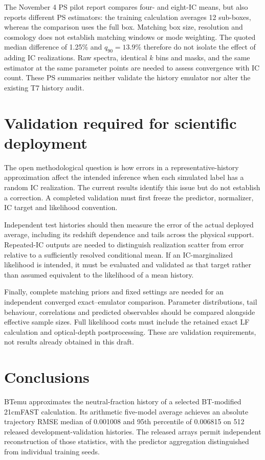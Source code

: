 The November 4 PS pilot report compares four- and eight-IC means, but also reports different PS estimators: the training calculation averages 12 sub-boxes, whereas the comparison uses the full box. Matching box size, resolution and cosmology does not establish matching windows or mode weighting. The quoted median difference of 1.25\% and $q_{90}=13.9\%$ therefore do not isolate the effect of adding IC realizations. Raw spectra, identical $k$ bins and masks, and the same estimator at the same parameter points are needed to assess convergence with IC count. These PS summaries neither validate the history emulator nor alter the existing T7 history audit.

\section{Validation required for scientific deployment}\label{validation-plan}

The open methodological question is how errors in a representative-history approximation affect the intended inference when each simulated label has a random IC realization. The current results identify this issue but do not establish a correction. A completed validation must first freeze the predictor, normalizer, IC target and likelihood convention.

Independent test histories should then measure the error of the actual deployed average, including its redshift dependence and tails across the physical support. Repeated-IC outputs are needed to distinguish realization scatter from error relative to a sufficiently resolved conditional mean. If an IC-marginalized likelihood is intended, it must be evaluated and validated as that target rather than assumed equivalent to the likelihood of a mean history.

Finally, complete matching priors and fixed settings are needed for an independent converged exact--emulator comparison. Parameter distributions, tail behaviour, correlations and predicted observables should be compared alongside effective sample sizes. Full likelihood costs must include the retained exact LF calculation and optical-depth postprocessing. These are validation requirements, not results already obtained in this draft.


\section{Conclusions}\label{conclusions}

BTemu approximates the neutral-fraction history of a selected BT-modified 21cmFAST calculation. Its arithmetic five-model average achieves an absolute trajectory RMSE median of 0.001008 and 95th percentile of 0.006815 on 512 released development-validation histories. The released arrays permit independent reconstruction of those statistics, with the predictor aggregation distinguished from individual training seeds.

